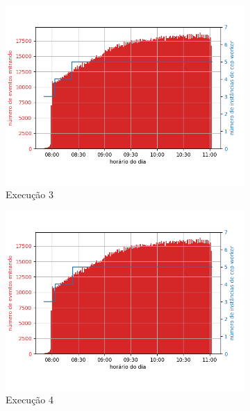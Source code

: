 \begin{figure}[p]
\begin{subfigure}{.5\textwidth}
  \centering
  \includegraphics[width=\linewidth]{figuras/graphics/carga_e_workers_horario8-dez-su.png}  
  \caption{Execução 3}
  \label{fig:cewh-8-dez-su}
\end{subfigure}
\begin{subfigure}{.5\textwidth}
  \centering
  \includegraphics[width=\linewidth]{figuras/graphics/carga_e_workers_horario9-dez-su.png}  
  \caption{Execução 4}
  \label{fig:scewh-9-dez-su}
\end{subfigure}
\begin{subfigure}{.5\textwidth}
  \centering

\end{subfigure}
\end{figure}
